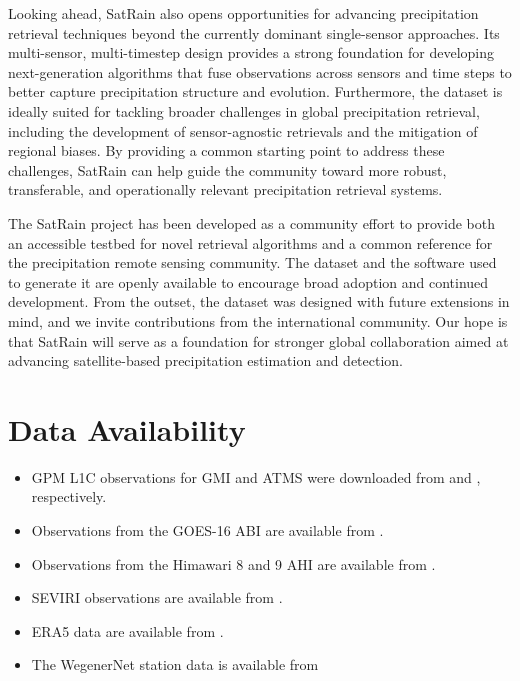 \documentclass[11pt]{article}
\begin{document}
Looking ahead, SatRain also opens opportunities for advancing precipitation
retrieval techniques beyond the currently dominant single-sensor approaches. Its
multi-sensor, multi-timestep design provides a strong foundation for developing
next-generation algorithms that fuse observations across sensors and time steps
to better capture precipitation structure and evolution. Furthermore, the
dataset is ideally suited for tackling broader challenges in global
precipitation retrieval, including the development of sensor-agnostic retrievals
and the mitigation of regional biases. By providing a common starting point to
address these challenges, SatRain can help guide the community toward more
robust, transferable, and operationally relevant precipitation retrieval
systems.

The SatRain project has been developed as a community effort to provide both an
accessible testbed for novel retrieval algorithms and a common reference for the
precipitation remote sensing community. The dataset and the software used to
generate it are openly available to encourage broad adoption and continued
development. From the outset, the dataset was designed with future extensions in
mind, and we invite contributions from the international community. Our hope is
that SatRain will serve as a foundation for stronger global collaboration aimed
at advancing satellite-based precipitation estimation and detection.

\section*{Data Availability}

\begin{itemize}
\item GPM L1C observations for GMI and ATMS were downloaded from \cite{Berg2022_GMI_L1C_R_V07} and \cite{Berg2022_ATMS_NOAA20_1C_V07}, respectively.
\item Observations from the GOES-16 ABI are available from \cite{NOAA_GOES_AWS}.
\item Observations from the Himawari 8 and 9 AHI are available from \cite{NOAA_HIMAWARI_AWS}.
\item SEVIRI observations are available from \cite{EUMETSAT_SEVIRI}.
\item ERA5 data are available from \cite{CDS_ERA5}.
\item The WegenerNet station data is available from \cite{WegenerNet2025}
\end{itemize}
\end{document}
